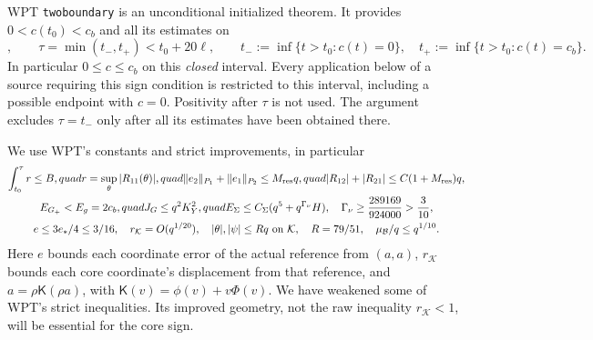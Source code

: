 \documentclass[11pt]{article}
\numberwithin{equation}{section}
\theoremstyle{remark}\newtheorem{remark}[theorem]{Remark}
\newcommand{\KK}{\mathcal K}
\newcommand{\BB}{\mathcal B}
\newcommand{\Gp}{G_+}
\newcommand{\Kfun}{\mathsf K}
\newcommand{\src}[2]{\textup{#1} \texttt{#2}}
\begin{document}
\src{WPT}{twoboundary} is an unconditional initialized theorem.
It provides $0<c(t_0)<c_b$ and all its estimates on
\begin{equation}
 [t_0,\tau],\qquad
 \tau=\min(t_-,t_+)<t_0+20\ell,\qquad
 t_-:=\inf\{t>t_0:c(t)=0\},\quad
 t_+:=\inf\{t>t_0:c(t)=c_b\}.
 \label{an03rbv1:twostop}
\end{equation}
In particular $0\le c\le c_b$ on this \emph{closed} interval.
Every application below of a source requiring this sign condition
is restricted to this interval, including a possible endpoint with
$c=0$. Positivity after $\tau$ is not used. The argument excludes
$\tau=t_-$ only after all its estimates have been obtained there.

We use WPT's constants and strict improvements, in particular
\begin{gather}
 \int_{t_0}^{\tau}r\le B,quad
 r=\sup_\theta|R_{11}(\theta)|,quad
 \|e_2\|_{P_1}+\|e_1\|_{P_2}\le M_{\rm res}q,quad
 |R_{12}|+|R_{21}|\le C(1+M_{\rm res})q,
 \label{an03rbv1:matrixinputs}\\
 E_{\Gp}<E_g=2c_b,quad J_G\le q^2K_Y^2,quad
 E_\Sigma\le C_\Sigma(q^5+q^{\Gamma_\nu}H),\quad
 \Gamma_\nu\ge\frac{289169}{924000}>\frac3{10},
 \label{an03rbv1:energyinputs}\\
 e\le3e_*/4\le3/16,\quad r_{\KK}=O(q^{1/20}),\quad
 |\theta|,|\psi|\le Rq\text{ on }\KK,\quad R=79/51,
 \quad \mu_{\BB}/q\le q^{1/10}.
 \label{an03rbv1:geometryinputs}
\end{gather}
Here $e$ bounds each coordinate error of the actual reference from
$(a,a)$, $r_{\KK}$ bounds each core coordinate's displacement from
that reference, and $a=\rho\Kfun(\rho a)$, with
$\Kfun(v)=\phi(v)+v\Phi(v)$. We have weakened some of WPT's
strict inequalities. Its improved geometry, not the raw inequality
$r_{\KK}<1$, will be essential for the core sign.
\end{document}
